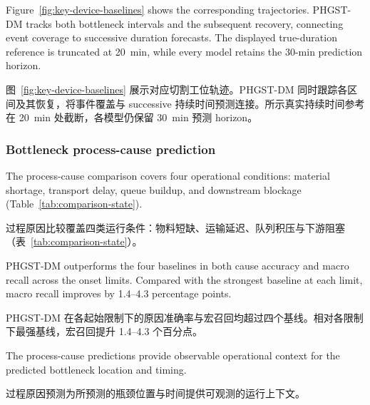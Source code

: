 \documentclass[a4paper,fleqn]{cas-dc}
\newcommand{\zhpara}[1]{%
  \par\begingroup\small\color{black!72}\noindent #1\par\endgroup}
\begin{document}
Figure~\ref{fig:key-device-baselines} shows the corresponding trajectories. PHGST-DM tracks both bottleneck intervals and the subsequent recovery, connecting event coverage to successive duration forecasts. The displayed true-duration reference is truncated at 20~min, while every model retains the 30-min prediction horizon.

\zhpara{图~\ref{fig:key-device-baselines} 展示对应切割工位轨迹。PHGST-DM 同时跟踪各区间及其恢复，将事件覆盖与 successive 持续时间预测连接。所示真实持续时间参考在 20~min 处截断，各模型仍保留 30~min 预测 horizon。}




\subsubsection{Bottleneck process-cause prediction}\label{sec:comparison-cause}

The process-cause comparison covers four operational conditions: material shortage, transport delay, queue buildup, and downstream blockage (Table~\ref{tab:comparison-state}).

\zhpara{过程原因比较覆盖四类运行条件：物料短缺、运输延迟、队列积压与下游阻塞（表~\ref{tab:comparison-state}）。}


PHGST-DM outperforms the four baselines in both cause accuracy and macro recall across the onset limits. Compared with the strongest baseline at each limit, macro recall improves by 1.4--4.3 percentage points.

\zhpara{PHGST-DM 在各起始限制下的原因准确率与宏召回均超过四个基线。相对各限制下最强基线，宏召回提升 1.4--4.3 个百分点。}


The process-cause predictions provide observable operational context for the predicted bottleneck location and timing.

\zhpara{过程原因预测为所预测的瓶颈位置与时间提供可观测的运行上下文。}
\end{document}
